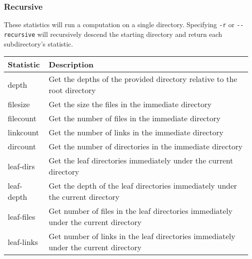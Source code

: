 \subsubsection{Recursive}
These statistics will run a computation on a single
directory. Specifying \texttt{-r} or \texttt{-{}-recursive} will
recursively descend the starting directory and return each
subdirectory's statistic.
\\
\begin{table}[h!]
  \begin{tabular} {| l | l |}
    \hline
    Statistic & Description \\
    \hline
    depth & Get the depths of the provided directory relative to the root
    directory \\
    \hline
    filesize & Get the size the files in the immediate directory \\
    \hline
    filecount & Get the number of files in the immediate directory \\
    \hline
    linkcount & Get the number of links in the immediate directory \\
    \hline
    dircount & Get the number of directories in the immediate directory \\
    \hline
    leaf-dirs & Get the leaf directories immediately under the current
    directory \\
    \hline
    leaf-depth & Get the depth of the leaf directories immediately under
    the current directory \\
    \hline
    leaf-files & Get number of files in the leaf directories immediately
    under the current directory \\
    \hline
    leaf-links & Get number of links in the leaf directories immediately
    under the current directory \\
    \hline
  \end{tabular}
\end{table}

